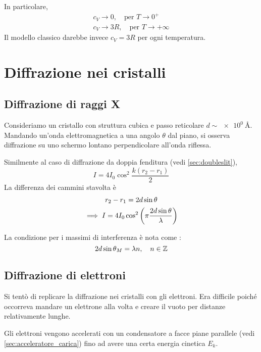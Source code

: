 
In particolare,
\begin{gather}
    c_V
    \to 0, \quad \text{per } T \to 0^+ \\
    c_V \to 3 R, \quad \text{per } T \to +\infty
\end{gather}
Il modello classico darebbe invece $c_V = 3 R$ per ogni temperatura.


\section{Diffrazione nei cristalli}

\subsection{Diffrazione di raggi X}

Consideriamo un cristallo con struttura cubica e passo reticolare $d \sim \qty{e0}{\angstrom}$.
Mandando un'onda elettromagnetica a una angolo $\theta$ dal piano, si osserva diffrazione su uno schermo lontano perpendicolare all'onda riflessa.

Similmente al caso di diffrazione da doppia fenditura (vedi \autoref{sec:doubleslit}),
\begin{equation}
    I = 4 I_0 \cos^2 \frac{k (r_2 - r_1)}{2}
\end{equation}
La differenza dei cammini stavolta è
\begin{gather}
    r_2 - r_1 = 2 d \sin \theta \\
    \implies I = 4 I_0 \cos^2 \left( \pi \frac{2 d \sin \theta}{\lambda} \right)
\end{gather}

La condizione per i massimi di interferenza è nota come :
\begin{equation}
    2 d \sin \theta_M= \lambda n, \quad n \in \mathbb{Z}
\end{equation}

\subsection{Diffrazione di elettroni}

Si tentò di replicare la diffrazione nei cristalli con gli elettroni.
Era difficile poiché occorreva mandare un elettrone alla volta e creare il vuoto per distanze relativamente lunghe.

Gli elettroni vengono accelerati con un condensatore a facce piane parallele (vedi \autoref{sec:acceleratore_carica}) fino ad avere una certa energia cinetica $E_k$.

